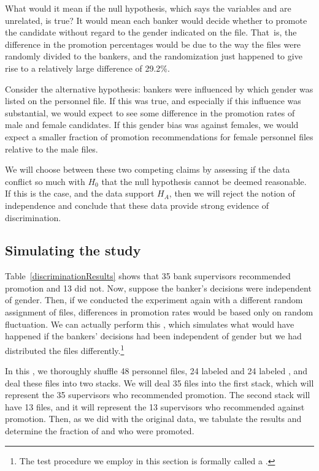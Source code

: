 What would it mean if the null hypothesis, which says the variables  and  are unrelated, is true? It would mean each banker would decide whether to promote the candidate without regard to the gender indicated on the file. That~is, the difference in the promotion percentages would be due to the way the files were randomly divided to the bankers, and the randomization just happened to give rise to a relatively large difference of 29.2\%.

Consider the alternative hypothesis: bankers were influenced by which gender was listed on the personnel file. If this was true, and especially if this influence was substantial, we would expect to see some difference in the promotion rates of male and female candidates. If this gender bias was against females, we would expect a smaller fraction of promotion recommendations for female personnel files relative to the male files.

We will choose between these two competing claims by assessing if the data conflict so much with $H_0$ that the null hypothesis cannot be deemed reasonable. If this is the case, and the data support $H_A$, then we will reject the notion of independence and conclude that these data provide strong evidence of discrimination.

\subsection{Simulating the study}
\label{simulatingTheStudy}

Table~\ref{discriminationResults} shows that 35 bank supervisors recommended promotion and 13 did not. Now, suppose the banker's decisions were independent of gender. Then, if we conducted the experiment again with a different random assignment of files, differences in promotion rates would be based only on random fluctuation. We can actually perform this , which simulates what would have happened if the bankers' decisions had been independent of gender but we had distributed the files differently.\footnote{The test procedure we employ in this section is formally called a .}

In this , we thoroughly shuffle 48 personnel files, 24 labeled  and 24 labeled , and deal these files into two stacks. We will deal 35 files into the first stack, which will represent the 35 supervisors who recommended promotion. The second stack will have 13 files, and it will represent the 13 supervisors who recommended against promotion. Then, as we did with the original data, we tabulate the results and determine the fraction of  and  who were promoted.

